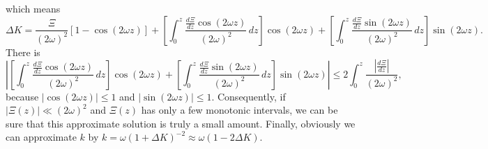 \documentclass[
 jor,
 amsmath,amssymb,preprint,
]{revtex4-2}
\begin{document}
which means
\begin{equation}
    \Delta K=\frac{\Xi}{(2\omega)^2}[1-\cos(2\omega z)]+\left[\int_{0}^z\frac{\frac{d\Xi}{d z}\cos(2\omega z)}{(2\omega)^2}\,d z\right]\cos(2\omega z)+\left[\int_{0}^z\frac{\frac{d\Xi}{d z}\sin(2\omega z)}{(2\omega)^2}\,d z\right]\sin(2\omega z).
\end{equation}
There is
\begin{equation}
    \left\lvert \left[\int_{0}^z\frac{\frac{d\Xi}{d z}\cos(2\omega z)}{(2\omega)^2}\,d z\right]\cos(2\omega z)+\left[\int_{0}^z\frac{\frac{d\Xi}{d z}\sin(2\omega z)}{(2\omega)^2}\,d z\right]\sin(2\omega z)\right\rvert \leq 2\int_{0}^z\frac{\left\lvert \frac{d\Xi}{d z}\right\rvert }{(2\omega)^2},
\end{equation}
because $\left|\cos(2\omega z)\right|\leq1$ and $\left|\sin(2\omega z)\right|\leq1$. Consequently, if $\left|\Xi(z)\right|\ll(2\omega)^2$ and $\Xi(z)$ has only a few monotonic intervals, we can be sure that this approximate solution is truly a small amount. Finally, obviously we can approximate $k$ by $k=\omega(1+\Delta K)^{-2}\approx \omega(1-2\Delta K)$.
\end{document}

